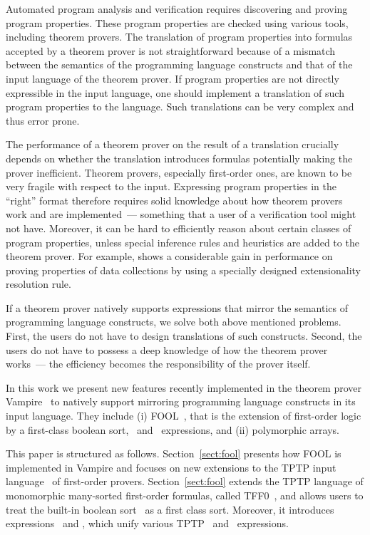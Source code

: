 Automated program analysis and verification requires discovering and proving program properties. These program properties are checked using various tools, including theorem provers. The translation of program properties into formulas accepted by a theorem prover is not straightforward because of a mismatch between the semantics of the programming language constructs and that of the input language of the theorem prover. If program properties are not directly expressible in the input language, one should implement a translation of such program properties to the language. Such translations can be very complex and thus error prone.

The performance of a theorem prover on the result of a translation crucially depends on whether the translation introduces formulas potentially making the prover inefficient. Theorem provers, especially first-order ones, are known to be very fragile with respect to the input. Expressing program properties in the ``right'' format therefore requires solid knowledge about how theorem provers work and are implemented~--- something that a user of a verification tool might not have. Moreover, it can be hard to efficiently reason about certain classes of program properties, unless special inference rules and heuristics are added to the theorem prover. For example, \cite{ATVA14} shows a considerable gain in performance on proving properties of data collections by using a specially designed extensionality resolution rule.

If a theorem prover natively supports expressions that mirror the semantics of programming language constructs, we solve both above mentioned problems. First, the users do not have to design translations of such constructs. Second, the users do not have to possess a deep knowledge of how the theorem prover works~--- the efficiency becomes the responsibility of the prover itself.

In this work we present new features recently implemented in the theorem prover Vampire~\cite{Vampire13} to natively support mirroring programming language constructs in its input language. They include (i) FOOL~\cite{FOOL}, that is the extension of first-order logic by a first-class boolean sort, \ITE\ and \LETIN\ expressions, and (ii) polymorphic arrays.

This paper is structured as follows. Section~\ref{sect:fool} presents how FOOL is implemented in Vampire and focuses on new extensions to the TPTP input language~\cite{TPTP} of first-order provers. Section~\ref{sect:fool}  extends the TPTP language of monomorphic many-sorted first-order formulas, called TFF0~\cite{tff0}, and allows users to treat the built-in boolean sort \tptpo\ as a first class sort. Moreover, it introduces expressions \dite\ and \dlet, which unify various TPTP \ITE\ and \LETIN\ expressions.

